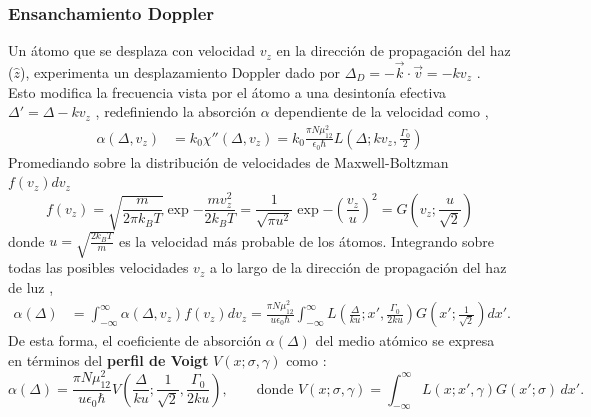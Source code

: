 \subsubsection*{Ensanchamiento Doppler}
Un átomo que se desplaza con velocidad $v_z$ en la dirección de propagación del haz ($\hat{z}$), experimenta un desplazamiento Doppler dado por $\Delta_D = -\vec{k} \cdot \vec{v} = -k v_z$ \cite{footAtomicPhysics2005}. Esto modifica la frecuencia vista por el átomo a una desintonía efectiva $\Delta' = \Delta - k v_z$ \cite{demtroderLaserSpectroscopy1996}, redefiniendo la absorción $\alpha$ dependiente de la velocidad como \cite{siddonsAbsoluteAbsorptionRubidium2008, pizzeyLaserSpectroscopyHot2022},
\begin{equation*}
\begin{split}
    \alpha(\Delta, v_z) &= k_0 \chi''(\Delta, v_z) = k_0 \frac{\pi N \mu_{12}^2}{\epsilon_0 \hbar} L\left(\Delta; kv_z, \frac{\Gamma_0}{2}\right)
\end{split}
\end{equation*}
Promediando sobre la distribución de velocidades de Maxwell-Boltzman $f(v_z)dv_z$ \cite{footAtomicPhysics2005, demtroderLaserSpectroscopy1996}
\begin{equation*}
    f(v_z) = \sqrt{\frac{m}{2 \pi k_B T}} \exp {- \frac{m v_z^2}{2 k_B T}} = \frac{1}{\sqrt{\pi u^2}}\exp{-\left(\frac{v_z}{u}\right)^2} = G\left(v_z; \frac{u}{\sqrt{2}}\right)
\end{equation*}
donde $u = \sqrt{\frac{2k_B T}{m}}$ es la velocidad más probable de los átomos. Integrando sobre todas las posibles velocidades $v_z$ a lo largo de la dirección de propagación del haz de luz \cite{siddonsAbsoluteAbsorptionRubidium2008},
\begin{equation*}
    \begin{split}
        \alpha(\Delta) &= \int_{-\infty}^{\infty} \alpha(\Delta, v_z) f(v_z) dv_z = \frac{\pi N \mu_{12}^2}{u \epsilon_0 \hbar} \int_{-\infty}^{\infty} L\left(\frac{\Delta}{ku}; x', \frac{\Gamma_0}{2ku}\right) G\left(x'; \frac{1}{\sqrt{2}}\right) dx'.
    \end{split}
\end{equation*}
De esta forma, el coeficiente de absorción $\alpha(\Delta)$ del medio atómico se expresa en términos del \textbf{perfil de Voigt} $V(x; \sigma, \gamma)$ como \cite{demtroderLaserSpectroscopy1996}:
\begin{equation*}
    \alpha(\Delta) = \frac{\pi N \mu_{12}^2}{u \epsilon_0 \hbar} V\left( \frac{\Delta}{ku}; \frac{1}{\sqrt{2}}, \frac{\Gamma_0}{2ku} \right), \qquad \text{donde } V(x; \sigma, \gamma) = \int_{-\infty}^{\infty} L(x; x', \gamma) G(x'; \sigma) \, dx'.
\end{equation*}

